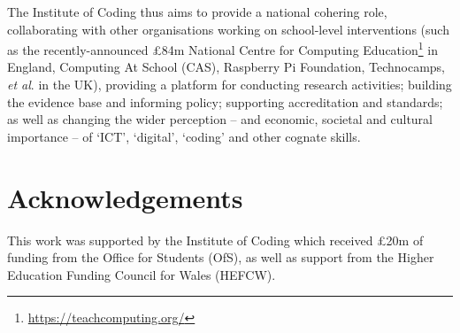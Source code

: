 \documentclass[conference]{IEEEtran}
\begin{document}
The Institute of Coding thus aims to provide a national cohering role,
collaborating with other organisations working on school-level
interventions (such as the recently-announced \pounds84m National
Centre for Computing
Education\footnote{\url{https://teachcomputing.org/}} in England,
Computing At School (CAS), Raspberry Pi Foundation, Technocamps, {\it
et al\/}. in the UK), providing a platform for conducting research
activities; building the evidence base and informing policy;
supporting accreditation and standards; as well as changing the wider
perception -- and economic, societal and cultural importance -- of
`ICT', `digital', `coding' and other cognate skills.

\section*{Acknowledgements}

This work was supported by the Institute of Coding which received
\pounds20m of funding from the Office for Students (OfS), as well as
support from the Higher Education Funding Council for Wales (HEFCW).


 
\end{document}
